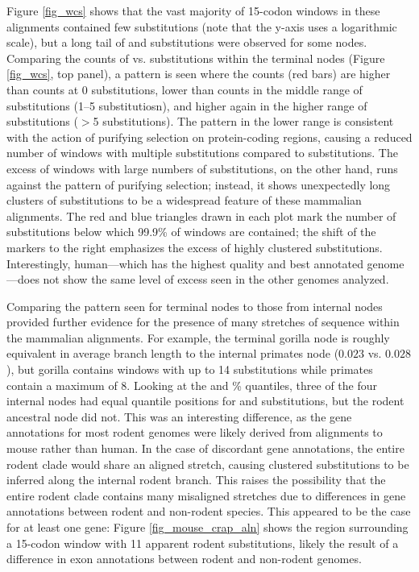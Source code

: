 Figure \ref{fig_wcs} shows that the vast majority of 15-codon windows
in these alignments contained few substitutions (note that the y-axis
uses a logarithmic scale), but a long tail of \nsyn and \syn
substitutions were observed for some nodes. Comparing the counts of
\nsyn vs. \syn substitutions within the terminal nodes (Figure
\ref{fig_wcs}, top panel), a pattern is seen where the \nsyn counts
(red bars) are higher than \syn counts at 0 substitutions, lower than
\syn counts in the middle range of substitutions (1--5 substitutiosn),
and higher again in the higher range of substitutions ($>$5
substitutions). The pattern in the lower range is consistent with the
action of purifying selection on protein-coding regions, causing a
reduced number of windows with multiple \nsyn substitutions compared
to \syn substitutions. The excess of windows with large numbers of
\nsyn substitutions, on the other hand, runs against the pattern of
purifying selection; instead, it shows unexpectedly long clusters of
\nsyn substitutions to be a widespread feature of these mammalian
alignments. The red and blue triangles drawn in each plot mark the
number of substitutions below which 99.9\% of windows are contained;
the shift of the \nsyn markers to the right emphasizes the excess of
highly clustered \nsyn substitutions. Interestingly, human---which has
the highest quality and best annotated genome---does not show the same
level of excess seen in the other genomes analyzed.

Comparing the pattern seen for terminal nodes to those from internal
nodes provided further evidence for the presence of many stretches of
\nhom sequence within the mammalian alignments. For example, the
terminal gorilla node is roughly equivalent in average branch length
to the internal primates node ($0.023$ vs. $0.028$), but gorilla
contains windows with up to 14 \nsyn substitutions while primates
contain a maximum of 8. Looking at the \nsyn and \%
quantiles, three of the four internal nodes had equal quantile
positions for \nsyn and \syn substitutions, but the rodent ancestral
node did not. This was an interesting difference, as the gene
annotations for most rodent genomes were likely derived from
alignments to mouse rather than human. In the case of discordant gene
annotations, the entire rodent clade would share an aligned \nhom
stretch, causing clustered substitutions to be inferred along the
internal rodent branch. This raises the possibility that the entire
rodent clade contains many misaligned \nhom stretches due to
differences in gene annotations between rodent and non-rodent
species. This appeared to be the case for at least one gene: Figure
\ref{fig_mouse_crap_aln} shows the region surrounding a 15-codon
window with 11 apparent rodent \nsyn substitutions, likely the result
of a difference in exon annotations between rodent and non-rodent
genomes.

